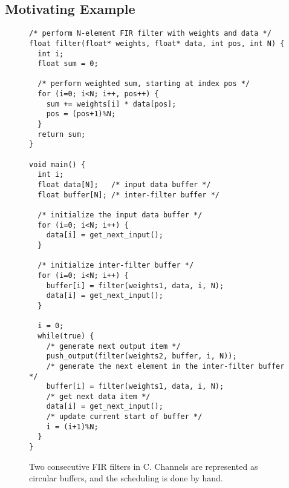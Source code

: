 \subsection{Motivating Example}
\begin{figure}[t]
\center
\epsfxsize=2.0in
\caption{Block diagram of two FIR filters.}
\vspace{11pt}
\scriptsize
\begin{verbatim}
/* perform N-element FIR filter with weights and data */
float filter(float* weights, float* data, int pos, int N) {
  int i;
  float sum = 0;

  /* perform weighted sum, starting at index pos */
  for (i=0; i<N; i++, pos++) {
    sum += weights[i] * data[pos];
    pos = (pos+1)%N;
  }
  return sum;
}

void main() {
  int i;
  float data[N];   /* input data buffer */
  float buffer[N]; /* inter-filter buffer */
  
  /* initialize the input data buffer */
  for (i=0; i<N; i++) {
    data[i] = get_next_input();
  }
  
  /* initialize inter-filter buffer */
  for (i=0; i<N; i++) {
    buffer[i] = filter(weights1, data, i, N);
    data[i] = get_next_input();
  }
  
  i = 0;
  while(true) {
    /* generate next output item */
    push_output(filter(weights2, buffer, i, N));
    /* generate the next element in the inter-filter buffer */
    buffer[i] = filter(weights1, data, i, N);
    /* get next data item */
    data[i] = get_next_input();
    /* update current start of buffer */
    i = (i+1)%N;
  }
}
\end{verbatim}
\vspace{-18pt}
\caption{Two consecutive FIR filters in C.  Channels are represented
as circular buffers, and the scheduling is done by hand.
\protect\label{fig:motivating-example}}
\vspace{-12pt}
\end{figure}

